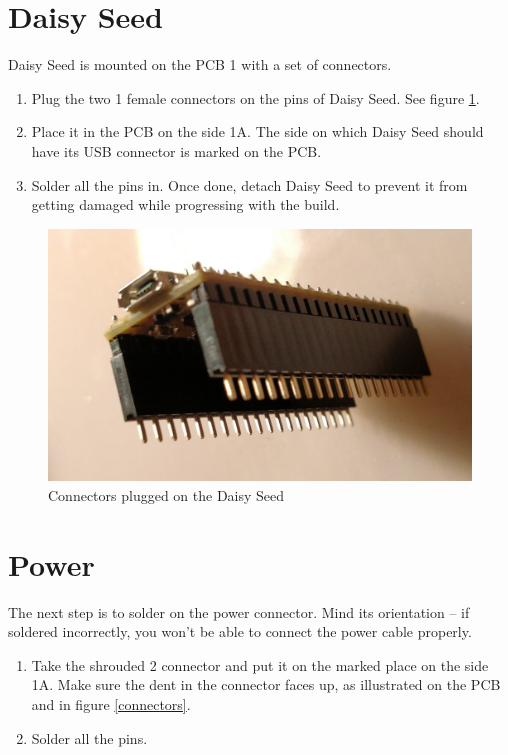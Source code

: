 \documentclass[10pt,a4paper,twocolumn]{article}
\begin{document}
\clearpage

\section{Daisy Seed}

Daisy Seed is mounted on the PCB 1 with a set of connectors.

\begin{enumerate}
  \item Plug the two 1 female connectors on the pins of Daisy Seed. See figure \ref{daisy}.
  \item Place it in the PCB on the side 1A. The side on which Daisy Seed should have its USB connector is marked on the PCB.
  \item Solder all the pins in. Once done, detach Daisy Seed to prevent it from getting damaged while progressing with the build.
\end{enumerate}

\begin{figure}[p]
  \centering
  \includegraphics[width=\linewidth]{p04.jpg}
  \caption{Connectors plugged on the Daisy Seed}
  \label{daisy}
\end{figure}

\section{Power}

The next step is to solder on the power connector. Mind its orientation -- if soldered incorrectly, you won't be able to connect the power cable properly.

\begin{enumerate}
  \item Take the shrouded 2 connector and put it on the marked place on the side 1A. Make sure the dent in the connector faces up, as illustrated on the PCB and in figure \ref{connectors}.
  \item Solder all the pins.
\end{enumerate}
\end{document}
